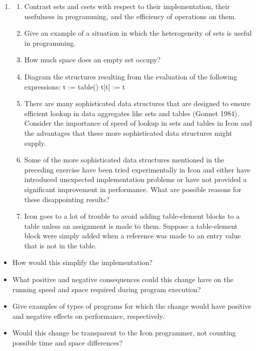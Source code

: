 \liststyleLvii
\begin{enumerate}
\item \begin{enumerate}

\item Contrast sets and csets with respect to their implementation,
their usefulness in programming, and the efficiency of operations on
them.

\item Give an example of a situation in which the heterogeneity of
sets is useful in programming.

\item How much space does an empty set occupy?

\item Diagram the structures resulting from the evaluation of the
following expressions:\newline
 t := table()\newline
 t[t] := t

\item There are many sophisticated data structures that are designed
to ensure efficient lookup in data aggregates like sets and tables
(Gonnet 1984). Consider the importance of speed of lookup in sets and
tables in Icon and the advantages that these more sophisticated data
structures might supply.

\item Some of the more sophisticated data structures mentioned in the
preceding exercise have been tried experimentally in Icon and either
have introduced unexpected implementation problems or have not
provided a significant improvement in performance. What are possible
reasons for these disappointing results?

\item Icon goes to a lot of trouble to avoid adding table-element
blocks to a table unless an assignment is made to them.  Suppose a
table-element block were simply added when a reference was made to an
entry value that is not in the table.
\end{enumerate}
\end{enumerate}
\liststyleLviii
\begin{itemize}
\item How would this simplify the implementation?

\item What positive and negative consequences could this change have
on the running speed and space required during program execution?

\item Give examples of types of programs for which the change would
have positive and negative effects on performance, respectively.

\item Would this change be transparent to the Icon programmer, not
counting possible time and space differences?
\end{itemize}
